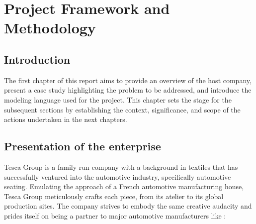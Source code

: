 %
%
\chapter{Project Framework and Methodology}
\section{Introduction}
The first chapter of this report aims to provide an overview of the host company, present a case study highlighting the problem to be addressed, and introduce the modeling language used for the project. This chapter sets the stage for the subsequent sections by establishing the context, significance, and scope of the actions undertaken in the next chapters.
\section{Presentation of the  enterprise}
Tesca Group is a family-run company with a background in textiles that has successfully ventured into the automotive industry, specifically automotive seating. Emulating the approach of a French automotive manufacturing house, Tesca Group meticulously crafts each piece, from its atelier to its global production sites\cite{T23}. The company strives to embody the same creative audacity and prides itself on being a partner to major automotive manufacturers like : 



